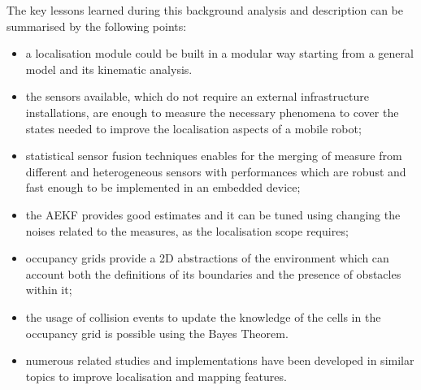 \noindent The key lessons learned during this background analysis and description can be summarised by the following points:
\begin{itemize}
    \item a localisation module could be built in a modular way starting from a general model and its kinematic analysis.%
    \item the sensors available, which do not require an external infrastructure installations, are enough to measure the necessary phenomena to cover the states needed to improve the localisation aspects of a mobile robot;
    \item statistical sensor fusion techniques enables for the merging of measure from different and heterogeneous sensors with performances which are robust and fast enough to be implemented in an embedded device;
    \item the \gls{AEKF} provides good estimates and it can be tuned using changing the noises related to the measures, as the localisation scope requires;
    \item occupancy grids provide a \gls{2D} abstractions of the environment which can account both the definitions of its boundaries and the presence of obstacles within it;
    \item the usage of collision events to update the knowledge of the cells in the occupancy grid is possible using the Bayes Theorem.
    \item numerous related studies and implementations have been developed in similar topics to improve localisation and mapping features.%
\end{itemize}



\cleardoublepage
